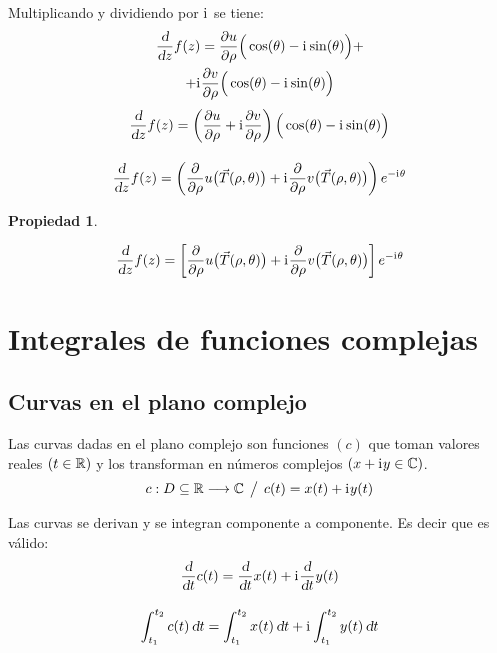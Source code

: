 \documentclass[a5paper,12pt,twoside]{book}
\newtheorem{prop}{{Propiedad}}[chapter]
\begin{document}
Multiplicando y dividiendo por $\mathrm{i}\mkern1mu$ se tiene:
\begin{multline*}
    \frac{\textsl{d}}{\textsl{d} z} f(z) = \frac{\partial u}{\partial \rho} \Big( \cos(\theta) - \mathrm{i}\mkern1mu \sin(\theta) \Big) +
    \\
    + \mathrm{i}\mkern1mu \frac{\partial v}{\partial \rho} \Big( \cos(\theta) - \mathrm{i}\mkern1mu \sin(\theta) \Big)
\end{multline*}
\begin{gather*}
    \dfrac{\textsl{d}}{\textsl{d} z} f(z) = \left( \frac{\partial u}{\partial \rho} + \mathrm{i}\mkern1mu \frac{\partial v}{\partial \rho} \right) \Big( \cos(\theta) - \mathrm{i}\mkern1mu \sin(\theta) \Big)
    \\[1em]
    \frac{\textsl{d}}{\textsl{d} z} f(z) = \left( \frac{\partial}{\partial \rho} u \big( \Vec{T}(\rho,\theta) \big) + \mathrm{i}\mkern1mu \frac{\partial}{\partial \rho} v \big( \Vec{T}(\rho,\theta) \big) \right) e^{-\mathrm{i}\mkern1mu\theta}
\end{gather*}

\begin{mdframed}[style=MyFrame1]
    \begin{prop}
    \end{prop}
    \begin{equation*}
        \frac{\textsl{d}}{\textsl{d} z} f(z) = \left[ \frac{\partial}{\partial \rho} u \big( \Vec{T}(\rho,\theta) \big) + \mathrm{i}\mkern1mu \frac{\partial}{\partial \rho} v \big( \Vec{T}(\rho,\theta) \big) \right] e^{-\mathrm{i}\mkern1mu\theta}
    \end{equation*}
\end{mdframed}


\chapter{Integrales de funciones complejas}


\section{Curvas en el plano complejo}

Las curvas dadas en el plano complejo son funciones $(c)$ que toman valores reales $(t\in\mathbb{R})$ y los transforman en números complejos $(x + \mathrm{i}\mkern1mu y \in\mathbb{C})$.
\begin{equation*}
    c: D\subseteq \mathbb{R} \longrightarrow \mathbb{C} \hspace{1ex} \big/ \hspace{1ex} c(t) = x(t) + \mathrm{i}\mkern1mu y(t)
\end{equation*}

Las curvas se derivan y se integran componente a componente. Es decir que es válido:
\begin{gather*}
    \frac{\textsl{d}}{\textsl{d} t} c(t) = \frac{\textsl{d}}{\textsl{d} t} x(t) + \mathrm{i}\mkern1mu \frac{\textsl{d}}{\textsl{d} t} y(t)
    \\[1em]
    \int_{t_1}^{t_2} c(t) \, \textsl{d} t = \int_{t_1}^{t_2} x(t) \, \textsl{d} t + \mathrm{i}\mkern1mu \int_{t_1}^{t_2} y(t) \, \textsl{d} t
\end{gather*}
\end{document}
